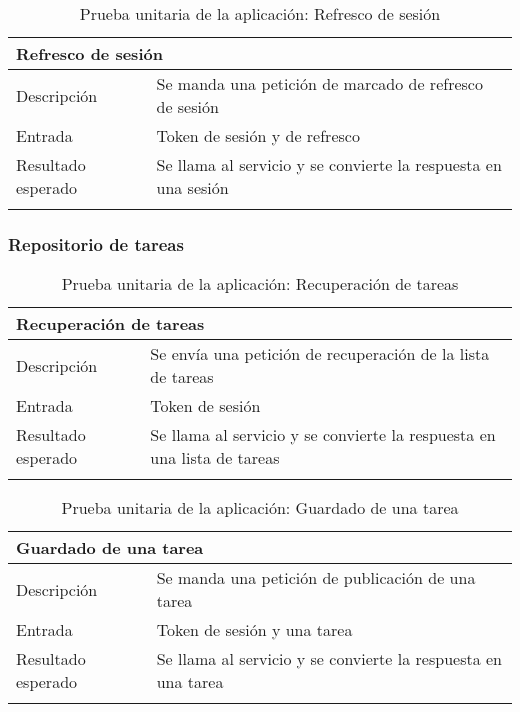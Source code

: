 \vspace{-15pt}
\begin{longtable}{|p{} p{}|}
    \hline
    \multicolumn{2}{|l|}{\textbf{Refresco de sesión}} \\ \hline 
    Descripción                 & Se manda una petición de marcado de refresco de sesión \\ \hline
    Entrada                     & Token de sesión y de refresco \\ \hline
    Resultado esperado          & Se llama al servicio  y se convierte la respuesta en una sesión \\ \hline
    \caption{Prueba unitaria de la aplicación: Refresco de sesión}
    \label{cp:u:app:refresco_sesion_repo}
\end{longtable}

\vspace{-15pt}
\subsubsection{Repositorio de tareas}

\begin{longtable}{|p{} p{}|}
    \hline
    \multicolumn{2}{|l|}{\textbf{Recuperación de tareas}} \\ \hline 
    Descripción                 & Se envía una petición de recuperación de la lista de tareas \\ \hline
    Entrada                     & Token de sesión \\ \hline
    Resultado esperado          & Se llama al servicio y se convierte la respuesta en una lista de tareas \\ \hline
    \caption{Prueba unitaria de la aplicación: Recuperación de tareas}
    \label{cp:u:app:recuperacion_tareas_repo}
\end{longtable}

\vspace{-15pt}
\begin{longtable}{|p{} p{}|}
    \hline
    \multicolumn{2}{|l|}{\textbf{Guardado de una tarea}} \\ \hline 
    Descripción                 & Se manda una petición de publicación de una tarea \\ \hline
    Entrada                     & Token de sesión y una tarea \\ \hline
    Resultado esperado          & Se llama al servicio y se convierte la respuesta en una tarea \\ \hline
    \caption{Prueba unitaria de la aplicación: Guardado de una tarea}
    \label{cp:u:app:guardado_tarea_repo}
\end{longtable}

